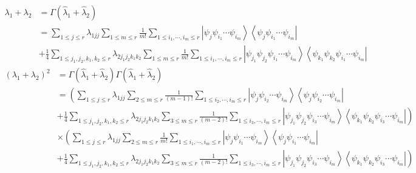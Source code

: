 \documentclass[aps,preprint]{revtex4}%
\begin{document}
\begin{align}
\lambda_{1}+\lambda_{2}  &  =\Gamma\left(  \hat{\lambda}_{1}+\hat{\lambda}%
_{2}\right) \nonumber\\
&  =\sum_{1\leq j\leq r}\lambda_{1jj}\sum_{1\leq m\leq r}\frac{1}{m!}%
\sum_{1\leq i_{1},\cdots,i_{m}\leq r}\left\vert \psi_{j}\psi_{i_{1}}\cdots
\psi_{i_{m}}\right\rangle \left\langle \psi_{j}\psi_{i_{1}}\cdots\psi_{i_{m}%
}\right\vert \nonumber\\
&  +\frac{1}{4}\sum_{1\leq j_{1},j_{2},k_{1},k_{2}\leq r}\lambda_{2j_{1}%
j_{2}k_{1}k_{2}}\sum_{1\leq m\leq r}\frac{1}{m!}\sum_{1\leq i_{1},\cdots
,i_{m}\leq r}\left\vert \psi_{j_{1}}\psi_{j_{2}}\psi_{i_{1}}\cdots\psi_{i_{m}%
}\right\rangle \left\langle \psi_{k_{1}}\psi_{k_{2}}\psi_{i_{1}}\cdots
\psi_{i_{m}}\right\vert
\end{align}%
\begin{align}
\left(  \lambda_{1}+\lambda_{2}\right)  ^{2}  &  =\Gamma\left(  \hat{\lambda
}_{1}+\hat{\lambda}_{2}\right)  \Gamma\left(  \hat{\lambda}_{1}+\hat{\lambda
}_{2}\right) \nonumber\\
&  =\left(  \sum_{1\leq j\leq r}\lambda_{1jj}\sum_{2\leq m\leq r}\frac
{1}{\left(  m-1\right)  !}\sum_{1\leq i_{2},\cdots,i_{m}\leq r}\left\vert
\psi_{j}\psi_{i_{2}}\cdots\psi_{i_{m}}\right\rangle \left\langle \psi_{j}%
\psi_{i_{2}}\cdots\psi_{i_{m}}\right\vert \right. \nonumber\\
&  \left.  +\frac{1}{4}\sum_{1\leq j_{1},j_{2},k_{1},k_{2}\leq r}%
\lambda_{2j_{1}j_{2}k_{1}k_{2}}\sum_{3\leq m\leq r}\frac{1}{\left(
m-2\right)  !}\sum_{1\leq i_{3},\cdots,i_{m}\leq r}\left\vert \psi_{j_{1}}%
\psi_{j_{2}}\psi_{i_{3}}\cdots\psi_{i_{m}}\right\rangle \left\langle
\psi_{k_{1}}\psi_{k_{2}}\psi_{i_{3}}\cdots\psi_{i_{m}}\right\vert \right)
\nonumber\\
&  \times\left(  \sum_{1\leq j\leq r}\lambda_{1jj}\sum_{2\leq m\leq r}\frac
{1}{m!}\sum_{1\leq i_{1},\cdots,i_{m}\leq r}\left\vert \psi_{j}\psi_{i_{1}%
}\cdots\psi_{i_{m}}\right\rangle \left\langle \psi_{j}\psi_{i_{1}}\cdots
\psi_{i_{m}}\right\vert \right. \nonumber\\
&  \left.  +\frac{1}{4}\sum_{1\leq j_{1},j_{2},k_{1},k_{2}\leq r}%
\lambda_{2j_{1}j_{2}k_{1}k_{2}}\sum_{3\leq m\leq r}\frac{1}{\left(
m-2\right)  !}\sum_{1\leq i_{3},\cdots,i_{m}\leq r}\left\vert \psi_{j_{1}}%
\psi_{j_{2}}\psi_{i_{3}}\cdots\psi_{i_{m}}\right\rangle \left\langle
\psi_{k_{1}}\psi_{k_{2}}\psi_{i_{3}}\cdots\psi_{i_{m}}\right\vert \right)
\end{align}
\end{document}
